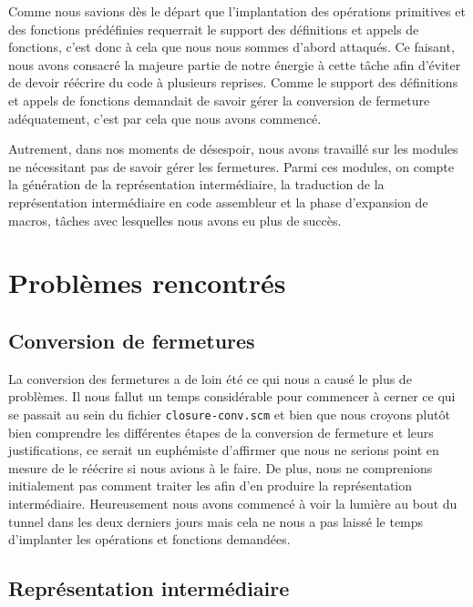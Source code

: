 \documentclass[12pt]{article}
\begin{document}
Comme nous savions dès le départ que l'implantation des opérations primitives et des fonctions prédéfinies requerrait le support des définitions et appels de fonctions, c'est donc à cela que nous nous sommes d'abord attaqués. Ce faisant, nous avons consacré la majeure partie de notre énergie à cette tâche afin d'éviter de devoir réécrire du code à plusieurs reprises. Comme le support des définitions et appels de fonctions demandait de savoir gérer la conversion de fermeture adéquatement, c'est par cela que nous avons commencé.

Autrement, dans nos moments de désespoir, nous avons travaillé sur les modules ne nécessitant pas de savoir gérer les fermetures. Parmi ces modules, on compte la génération de la représentation intermédiaire, la traduction de la représentation intermédiaire en code assembleur et la phase d'expansion de macros, tâches avec lesquelles nous avons eu plus de succès.

\section{Problèmes rencontrés}

\subsection{Conversion de fermetures}

La conversion des fermetures a de loin été ce qui nous a causé le plus de problèmes. Il nous fallut un temps considérable pour commencer à cerner ce qui se passait au sein du fichier \texttt{closure-conv.scm} et bien que nous croyons plutôt bien comprendre les différentes étapes de la conversion de fermeture et leurs justifications, ce serait un euphémiste d'affirmer que nous ne serions point en mesure de le réécrire si nous avions à le faire. De plus, nous ne comprenions initialement pas comment traiter les  afin d'en produire la représentation intermédiaire. Heureusement nous avons commencé à voir la lumière au bout du tunnel dans les deux derniers jours mais cela ne nous a pas laissé le temps d'implanter les opérations et fonctions demandées.

\subsection{Représentation intermédiaire}
\end{document}

